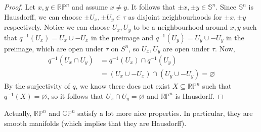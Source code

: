 \documentclass[12pt,reqno]{amsart}
\numberwithin{theorem}{section}
\theoremstyle{definition}
\theoremstyle{remark}
\numberwithin{equation}{section}
\newcommand{\C}{\mathbb C}
\renewcommand{\S}{\mathbb S}
\renewcommand{\P}{\mathbb{P}}
\theoremstyle{definition}
\newcommand{\R}{\mathbb{R}}
\begin{document}
\begin{proof}
    Let $x,y \in \mathbb{R}\P^n$ and assume $x\neq y$. It follows that $\pm x,\pm y \in \S^n$. Since $\S^n$ is Hausdorff, we can choose $\pm U_x,\pm U_y \in \tau$ as disjoint neighbourhoods for $\pm x,\pm y$ respectively. Notice we can choose ${U}_x,{U}_y$ to be a neighbourhood around $x,y$ such that $q^{-1}({U}_x) =  U_x\cup -U_x$ in the preimage and $q^{-1}({U}_y)= U_y \cup -U_y$ in the preimage, which are open under $\tau$ on $S^n$, so ${U}_x,{U}_y$ are open under ${\tau}$. Now, \begin{align*}
        q^{-1}({U}_x \cap {U}_y) &= q^{-1}({U}_x)\cap q^{-1}({U}_y) \\
        &= (U_x\cup -U_x) \cap (U_y \cup -U_y) = \varnothing
    \end{align*}
    By the surjectivity of $q$, we know there does not exist $X \subseteq \mathbb{R}\P^n$ such that $q^{-1}(X) = \varnothing$, so it follows that ${U}_x \cap {U}_y = \varnothing$ and $\mathbb{R}\P^n$ is Hausdorff.
\end{proof}
Actually, $\R\P^n$ and $\C\P^n$ satisfy a lot more nice properties. In particular, they are smooth manifolds (which implies that they are Hausdorff).
\end{document}
